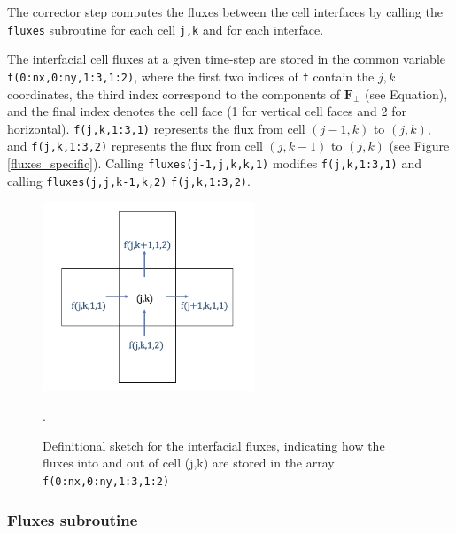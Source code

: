 \documentclass{article}
\newcommand{\code}[1]{\texttt{#1}}
\begin{document}
The corrector step computes the fluxes between the cell interfaces by calling the \code{fluxes} subroutine for each cell \code{j,k} and for each interface. 

The interfacial cell fluxes at a given time-step are stored in the common variable \code{f(0:nx,0:ny,1:3,1:2)}, where the first two indices of \code{f} contain the $j,k$ coordinates, the third index correspond to the components of  $\mathbf{F_\perp}$ (see Equation), and the final index denotes the cell face (1 for vertical cell faces and 2 for horizontal).   
\code{f(j,k,1:3,1)} represents the flux from cell $(j-1, k)$ to $(j, k)$, and
\code{f(j,k,1:3,2)} represents the flux from cell $(j, k-1)$ to $(j, k)$ (see Figure \ref{fluxes_specific}).
Calling \code{fluxes(j-1,j,k,k,1)} modifies \code{f(j,k,1:3,1)}  and calling \code{fluxes(j,j,k-1,k,2)} \code{f(j,k,1:3,2)}.

 \begin{figure}[h]
 \centering
\includegraphics[width=15pc]{grid/fluxes_specific.png}
 \caption{Definitional sketch for the interfacial fluxes, indicating how the fluxes into and out of cell (j,k) are stored in the array \code{f(0:nx,0:ny,1:3,1:2)}}.
 \label{fluxes_specific.png}
 \end{figure}

\subsubsection*{Fluxes subroutine}
\end{document}
